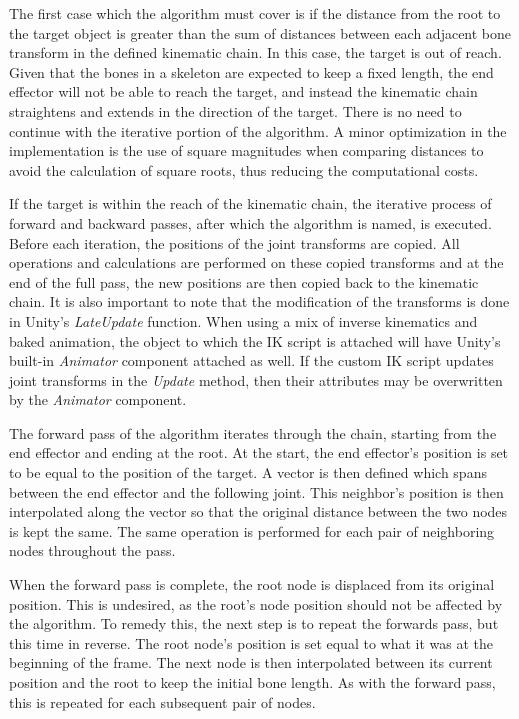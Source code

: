 The first case which the algorithm must cover is if the distance from the root
to the target object is greater than the sum of distances between each adjacent
bone transform in the defined kinematic chain. In this case, the target is out
of reach. Given that the bones in a skeleton are expected to keep a fixed
length, the end effector will not be able to reach the target, and instead the
kinematic chain straightens and extends in the direction of the target. There is
no need to continue with the iterative portion of the algorithm. A minor
optimization in the implementation is the use of square magnitudes when
comparing distances to avoid the calculation of square roots, thus reducing the
computational costs.

If the target is within the reach of the kinematic chain, the iterative process
of forward and backward passes, after which the algorithm is named, is executed.
Before each iteration, the positions of the joint transforms are copied. All
operations and calculations are performed on these copied transforms and at the
end of the full pass, the new positions are then copied back to the kinematic
chain. It is also important to note that the modification of the transforms is
done in Unity's \textit{LateUpdate} function. When using a mix of inverse
kinematics and baked animation, the object to which the IK script is attached
will have Unity's built-in \textit{Animator} component attached as well. If the
custom IK script updates joint transforms in the \textit{Update} method,
then their attributes may be overwritten by the \textit{Animator} component. 

The forward pass of the algorithm iterates through the chain, starting from the
end effector and ending at the root. At the start, the end effector's position
is set to be equal to the position of the target. A vector is then defined which
spans between the end effector and the following joint. This neighbor's position
is then interpolated along the vector so that the original distance between the
two nodes is kept the same. The same operation is performed for each pair of
neighboring nodes throughout the pass. 

When the forward pass is complete, the root node is displaced from its original
position. This is undesired, as the root's node position should not be affected
by the algorithm. To remedy this, the next step is to repeat the forwards pass,
but this time in reverse. The root node's position is set equal to what it was
at the beginning of the frame. The next node is then interpolated between its
current position and the root to keep the initial bone length. As with the
forward pass, this is repeated for each subsequent pair of nodes. 

